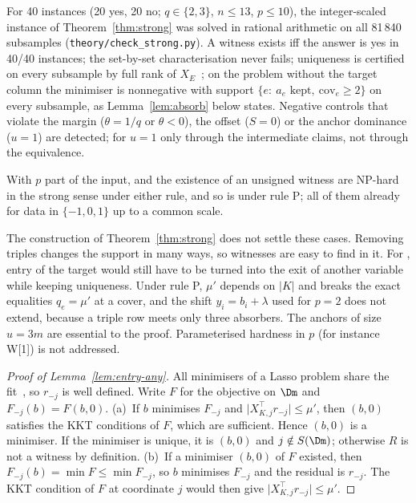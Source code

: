 \begin{remark}\label{rem:verify-strong}
For 40  instances (20 yes, 20 no; $q\in\{2,3\}$, $n\le13$, $p\le10$), the integer-scaled instance of Theorem~\ref{thm:strong} was solved in rational arithmetic on all 81\,840 subsamples (\texttt{theory/check\_strong.py}). A witness exists iff the answer is yes in 40/40 instances; the set-by-set characterisation never fails; uniqueness is certified on every subsample by full rank of $X_E$~\citep{tibshirani2013}; on the problem without the target column the minimiser is nonnegative with support $\{e:\ a_e\text{ kept},\ \mathrm{cov}_e\ge2\}$ on every subsample, as Lemma~\ref{lem:absorb} below states. Negative controls that violate the margin ($\theta=1/q$ or $\theta<0$), the offset ($S=0$) or the anchor dominance ($u=1$) are detected; for $u=1$ only through the intermediate claims, not through the equivalence.
\end{remark}

\begin{conjecture}\label{conj:strong-rest}
With $p$ part of the input,  and the existence of an unsigned  witness are NP-hard in the strong sense under either rule, and so is  under rule P; all of them already for data in $\{-1,0,1\}$ up to a common scale.
\end{conjecture}
\noindent The construction of Theorem~\ref{thm:strong} does not settle these cases. Removing triples changes the support in many ways, so  witnesses are easy to find in it. For , entry of the target would still have to be turned into the exit of another variable while keeping uniqueness. Under rule P, $\mu'$ depends on $|K|$ and breaks the exact equalities $q_e=\mu'$ at a cover, and the shift $y_i=b_i+\lambda$ used for $p=2$ does not extend, because a triple row meets only three absorbers. The anchors of size $u=3m$ are essential to the proof. Parameterised hardness in $p$ (for instance W[1]) is not addressed.


\begin{proof}[Proof of Lemma~\ref{lem:entry-any}]
All minimisers of a Lasso problem share the fit~\citep{tibshirani2013}, so $r_{-j}$ is well defined. Write $F$ for the objective on $\Dm$ and $F_{-j}(b)=F(b,0)$. (a)~If $b$ minimises $F_{-j}$ and $\lvert X_{K,j}^{\top}r_{-j}\rvert\le\mu'$, then $(b,0)$ satisfies the KKT conditions of $F$, which are sufficient. Hence $(b,0)$ is a minimiser. If the minimiser is unique, it is $(b,0)$ and $j\notin S(\Dm)$; otherwise $R$ is not a witness by definition. (b)~If a minimiser $(b,0)$ of $F$ existed, then $F_{-j}(b)=\min F\le\min F_{-j}$, so $b$ minimises $F_{-j}$ and the residual is $r_{-j}$. The KKT condition of $F$ at coordinate $j$ would then give $\lvert X_{K,j}^{\top}r_{-j}\rvert\le\mu'$.
\end{proof}

